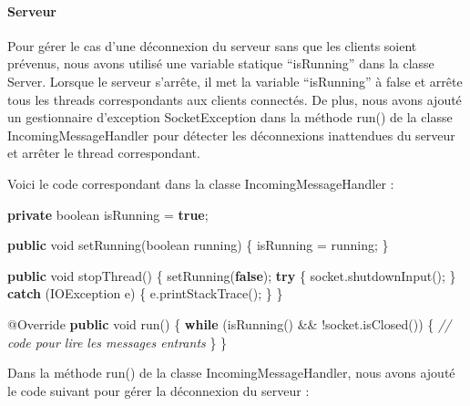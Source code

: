 \documentclass[
]{article}
\newenvironment{Shaded}{}{}
\newcommand{\AttributeTok}[1]{\textcolor[rgb]{0.49,0.56,0.16}{#1}}
\newcommand{\BuiltInTok}[1]{#1}
\newcommand{\CommentTok}[1]{\textcolor[rgb]{0.38,0.63,0.69}{\textit{#1}}}
\newcommand{\DataTypeTok}[1]{\textcolor[rgb]{0.56,0.13,0.00}{#1}}
\newcommand{\FunctionTok}[1]{\textcolor[rgb]{0.02,0.16,0.49}{#1}}
\newcommand{\KeywordTok}[1]{\textcolor[rgb]{0.00,0.44,0.13}{\textbf{#1}}}
\newcommand{\NormalTok}[1]{#1}
\begin{document}
\hypertarget{serveur}{%
\paragraph{Serveur\\}\label{serveur}}

Pour gérer le cas d'une déconnexion du serveur sans que les clients
soient prévenus, nous avons utilisé une variable statique ``isRunning''
dans la classe Server. Lorsque le serveur s'arrête, il met la variable
``isRunning'' à false et arrête tous les threads correspondants aux
clients connectés. De plus, nous avons ajouté un gestionnaire
d'exception SocketException dans la méthode run() de la classe
IncomingMessageHandler pour détecter les déconnexions inattendues du
serveur et arrêter le thread correspondant.

Voici le code correspondant dans la classe IncomingMessageHandler :

\begin{Shaded}
\begin{Highlighting}[]
\KeywordTok{private} \DataTypeTok{boolean}\NormalTok{ isRunning = }\KeywordTok{true}\NormalTok{;}

\KeywordTok{public} \DataTypeTok{void} \FunctionTok{setRunning}\NormalTok{(}\DataTypeTok{boolean}\NormalTok{ running) \{}
\NormalTok{    isRunning = running;}
\NormalTok{\}}

\KeywordTok{public} \DataTypeTok{void} \FunctionTok{stopThread}\NormalTok{() \{}
    \FunctionTok{setRunning}\NormalTok{(}\KeywordTok{false}\NormalTok{);}
    \KeywordTok{try}\NormalTok{ \{}
\NormalTok{        socket.}\FunctionTok{shutdownInput}\NormalTok{();}
\NormalTok{    \} }\KeywordTok{catch}\NormalTok{ (}\BuiltInTok{IOException}\NormalTok{ e) \{}
\NormalTok{        e.}\FunctionTok{printStackTrace}\NormalTok{();}
\NormalTok{    \}}
\NormalTok{\}}

\AttributeTok{@Override}
\KeywordTok{public} \DataTypeTok{void} \FunctionTok{run}\NormalTok{() \{}
    \KeywordTok{while}\NormalTok{ (}\FunctionTok{isRunning}\NormalTok{() \&\& !socket.}\FunctionTok{isClosed}\NormalTok{()) \{}
        \CommentTok{// code pour lire les messages entrants}
\NormalTok{    \}}
\NormalTok{\}}
\end{Highlighting}
\end{Shaded}

Dans la méthode run() de la classe IncomingMessageHandler, nous avons
ajouté le code suivant pour gérer la déconnexion du serveur :
\end{document}
